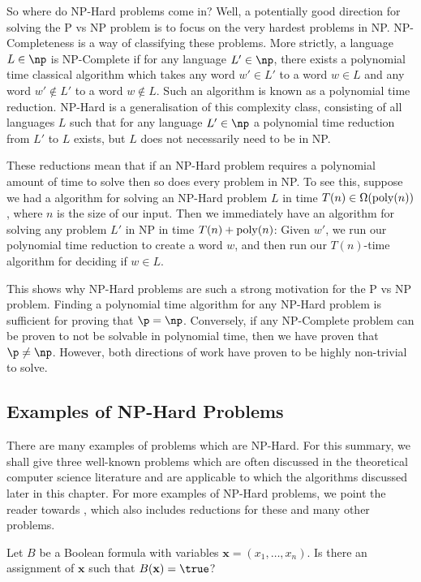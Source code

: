 So where do NP-Hard problems come in? Well, a potentially good direction for solving the P vs NP problem is to focus on the very hardest problems in NP. NP-Completeness is a way of classifying these problems. More strictly, a language $L \in \np$ is NP-Complete if for any language $L' \in \np$, there exists a polynomial time classical algorithm which takes any word $w'\in L'$ to a word $w \in L$ and any word $w'\notin L'$ to a word $w \notin L$. Such an algorithm is known as a polynomial time reduction. NP-Hard is a generalisation of this complexity class, consisting of all languages $L$ such that for any language $L' \in \np$ a polynomial time reduction from $L'$ to $L$ exists, but $L$ does not necessarily need to be in NP.

These reductions mean that if an NP-Hard problem requires a polynomial amount of time to solve then so does every problem in NP. To see this, suppose we had a algorithm for solving an NP-Hard problem $L$ in time $T(n) \in \Omega(\operatorname{poly}(n))$, where $n$ is the size of our input. Then we immediately have an algorithm for solving any problem $L'$ in NP in time $T(n)+\operatorname{poly}(n)$: Given $w'$, we run our polynomial time reduction to create a word $w$, and then run our $T(n)$-time algorithm for deciding if $w \in L$.

This shows why NP-Hard problems are such a strong motivation for the P vs NP problem. Finding a polynomial time algorithm for any NP-Hard problem is sufficient for proving that $\p = \np$. Conversely, if any NP-Complete problem can be proven to not be solvable in polynomial time, then we have proven that $\p \neq \np$. However, both directions of work have proven to be highly non-trivial to solve.

\subsection{Examples of NP-Hard Problems}

There are many examples of problems which are NP-Hard. For this summary, we shall give three well-known problems which are often discussed in the theoretical computer science literature and are applicable to which the algorithms discussed later in this chapter. For more examples of NP-Hard problems, we point the reader towards \cite{karp1972, garey1979}, which also includes reductions for these and many other problems.

\begin{problem}
Let $B$ be a Boolean formula with variables $\mathbf{x} = (x_1,\dots,x_n)$. Is there an assignment of $\mathbf{x}$ such that $B(\mathbf{x}) = \true$?
\end{problem}

